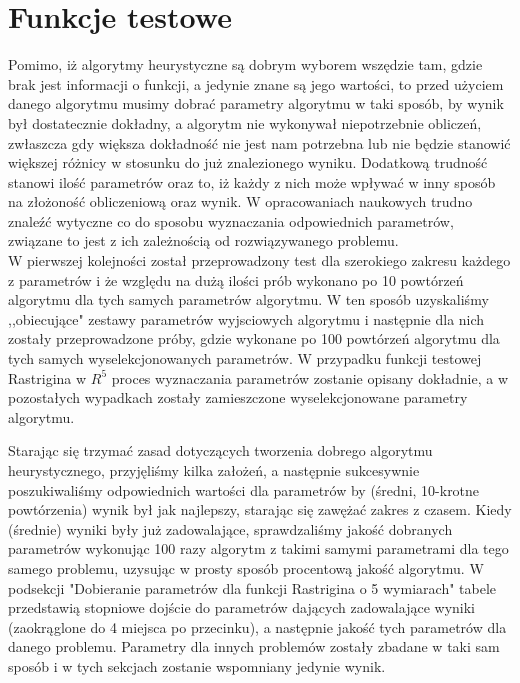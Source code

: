 \documentclass[twoside]{projektInzynierskiMS1}
\newcommand{\si}{ś}
\begin{document}
\section{Funkcje testowe}
Pomimo, iż algorytmy heurystyczne są dobrym wyborem wszędzie tam, gdzie brak jest informacji o funkcji, a jedynie znane są jego warto\si ci, to przed użyciem danego algorytmu musimy dobrać parametry algorytmu w taki sposób, by wynik był dostatecznie dokładny, a algorytm nie wykonywał niepotrzebnie obliczeń, zwłaszcza gdy większa dokładno\si ć nie jest nam potrzebna lub nie będzie stanowić większej różnicy w stosunku do już znalezionego wyniku. Dodatkową trudno\si ć stanowi ilo\si ć parametrów oraz to, iż każdy z nich może wpływać w inny sposób na złożono\si ć obliczeniową oraz wynik. W opracowaniach naukowych trudno znaleźć wytyczne co do sposobu wyznaczania odpowiednich parametrów, związane to jest z ich zależno\si cią od rozwiązywanego problemu. \\








W pierwszej kolejno\si ci został przeprowadzony test dla szerokiego zakresu każdego z parametrów i że względu na dużą ilo\si ci prób wykonano po 10 powtórzeń algorytmu dla tych samych parametrów algorytmu. W ten sposób uzyskali\si my ,,obiecujące" zestawy parametrów wyjsciowych algorytmu i następnie dla nich zostały przeprowadzone próby, gdzie wykonane po 100 powtórzeń algorytmu dla tych samych wyselekcjonowanych parametrów. W przypadku funkcji testowej Rastrigina w $R^5$ proces wyznaczania parametrów zostanie opisany dokładnie, a w pozostałych wypadkach zostały zamieszczone wyselekcjonowane parametry algorytmu.












Starając się trzymać zasad dotyczących tworzenia dobrego algorytmu heurystycznego, przyjęli\si my kilka założeń, a następnie sukcesywnie poszukiwali\si my odpowiednich warto\si ci dla parametrów by (\si redni, 10-krotne powtórzenia) wynik był jak najlepszy, starając się zawężać zakres z czasem. Kiedy (\si rednie) wyniki były już zadowalające, sprawdzali\si my jako\si ć dobranych parametrów wykonując 100 razy algorytm z takimi samymi parametrami dla tego samego problemu, uzysując w prosty sposób procentową jako\si ć algorytmu. W podsekcji "Dobieranie parametrów dla funkcji Rastrigina o 5 wymiarach" tabele przedstawią stopniowe doj\si cie do parametrów dających zadowalające wyniki (zaokrąglone do 4 miejsca po przecinku), a następnie jako\si ć tych parametrów dla danego problemu. Parametry dla innych problemów zostały zbadane w taki sam sposób i w tych sekcjach zostanie wspomniany jedynie wynik.
\end{document}

